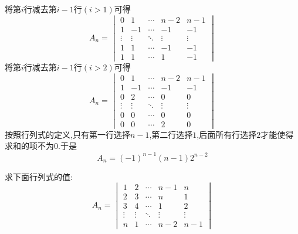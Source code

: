 \documentclass{ctexart}
\begin{document}
\begin{solution}
    将第$i$行减去第$i-1$行$(i>1)$可得
    \[A_n=\begin{vmatrix}
        0&1&\cdots&n-2&n-1\\
        1&-1&\cdots&-1&-1\\
        \vdots&\vdots&\ddots&\vdots&\vdots\\
        1&1&\cdots&-1&-1\\
        1&1&\cdots&1&-1
    \end{vmatrix}\]
    将第$i$行减去第$i-1$行$(i>2)$可得
    \[A_n=\begin{vmatrix}
        0&1&\cdots&n-2&n-1\\
        1&-1&\cdots&-1&-1\\
        0&2&\cdots&0&0\\
        \vdots&\vdots&\ddots&\vdots&\vdots\\
        0&0&\cdots&0&0\\
        0&0&\cdots&2&0
    \end{vmatrix}\]
    按照行列式的定义,只有第一行选择$n-1$,第二行选择$1$,后面所有行选择$2$才能使得求和的项不为$0$.于是
    \[A_n=(-1)^{n-1}(n-1)2^{n-2}\]
\end{solution}
\begin{problem}
    求下面行列式的值:
    \[A_n=\begin{vmatrix}
        1&2&\cdots&n-1&n\\
        2&3&\cdots&n&1\\
        3&4&\cdots&1&2\\
        \vdots&\vdots&\ddots&\vdots&\vdots\\
        n&1&\cdots&n-2&n-1
    \end{vmatrix}\]
\end{problem}
\end{document}
